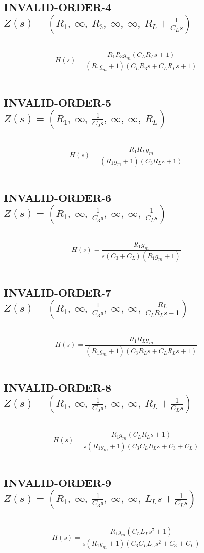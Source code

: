 \documentclass{article}
\begin{document}
\subsection{INVALID-ORDER-4 $Z(s) = \left( R_{1}, \  \infty, \  R_{3}, \  \infty, \  \infty, \  R_{L} + \frac{1}{C_{L} s}\right)$ } \ 
\textbf{\[H(s) = \frac{R_{1} R_{3} g_{m} \left(C_{L} R_{L} s + 1\right)}{\left(R_{1} g_{m} + 1\right) \left(C_{L} R_{3} s + C_{L} R_{L} s + 1\right)}\] } \ 
\subsection{INVALID-ORDER-5 $Z(s) = \left( R_{1}, \  \infty, \  \frac{1}{C_{3} s}, \  \infty, \  \infty, \  R_{L}\right)$ } \ 
\textbf{\[H(s) = \frac{R_{1} R_{L} g_{m}}{\left(R_{1} g_{m} + 1\right) \left(C_{3} R_{L} s + 1\right)}\] } \ 
\subsection{INVALID-ORDER-6 $Z(s) = \left( R_{1}, \  \infty, \  \frac{1}{C_{3} s}, \  \infty, \  \infty, \  \frac{1}{C_{L} s}\right)$ } \ 
\textbf{\[H(s) = \frac{R_{1} g_{m}}{s \left(C_{3} + C_{L}\right) \left(R_{1} g_{m} + 1\right)}\] } \ 
\subsection{INVALID-ORDER-7 $Z(s) = \left( R_{1}, \  \infty, \  \frac{1}{C_{3} s}, \  \infty, \  \infty, \  \frac{R_{L}}{C_{L} R_{L} s + 1}\right)$ } \ 
\textbf{\[H(s) = \frac{R_{1} R_{L} g_{m}}{\left(R_{1} g_{m} + 1\right) \left(C_{3} R_{L} s + C_{L} R_{L} s + 1\right)}\] } \ 
\subsection{INVALID-ORDER-8 $Z(s) = \left( R_{1}, \  \infty, \  \frac{1}{C_{3} s}, \  \infty, \  \infty, \  R_{L} + \frac{1}{C_{L} s}\right)$ } \ 
\textbf{\[H(s) = \frac{R_{1} g_{m} \left(C_{L} R_{L} s + 1\right)}{s \left(R_{1} g_{m} + 1\right) \left(C_{3} C_{L} R_{L} s + C_{3} + C_{L}\right)}\] } \ 
\subsection{INVALID-ORDER-9 $Z(s) = \left( R_{1}, \  \infty, \  \frac{1}{C_{3} s}, \  \infty, \  \infty, \  L_{L} s + \frac{1}{C_{L} s}\right)$ } \ 
\textbf{\[H(s) = \frac{R_{1} g_{m} \left(C_{L} L_{L} s^{2} + 1\right)}{s \left(R_{1} g_{m} + 1\right) \left(C_{3} C_{L} L_{L} s^{2} + C_{3} + C_{L}\right)}\] } \ 
\end{document}
